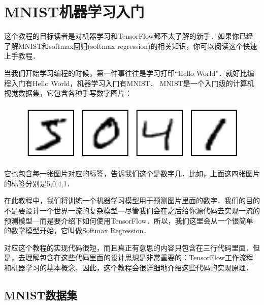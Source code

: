 


\newpage
\section {MNIST机器学习入门}\label{MINIST_beginner}


这个教程的目标读者是对机器学习和TensorFlow都不太了解的新手．如果你已经了解MNIST和softmax回归(softmax regression)的相关知识，你可以阅读这个快速上手教程．


当我们开始学习编程的时候，第一件事往往是学习打印“Hello World”．就好比编程入门有Hello World，机器学习入门有MNIST．
MNIST是一个入门级的计算机视觉数据集，它包含各种手写数字图片：

\begin{figure}[htbp]
\centering
\includegraphics[width=.55\textwidth]{../SOURCE/images/MNIST.png}
\caption{}
\end{figure}

它也包含每一张图片对应的标签，告诉我们这个是数字几．比如，上面这四张图片的标签分别是5,0,4,1．

在此教程中，我们将训练一个机器学习模型用于预测图片里面的数字．我们的目的不是要设计一个世界一流的复杂模型---尽管我们会在之后给你源代码去实现一流的预测模型---而是要介绍下如何使用TensorFlow．所以，我们这里会从一个很简单的数学模型开始，它叫做Softmax Regression．

对应这个教程的实现代码很短，而且真正有意思的内容只包含在三行代码里面．但是，去理解包含在这些代码里面的设计思想是非常重要的：TensorFlow工作流程和机器学习的基本概念．因此，这个教程会很详细地介绍这些代码的实现原理．

\subsection {MNIST数据集}

